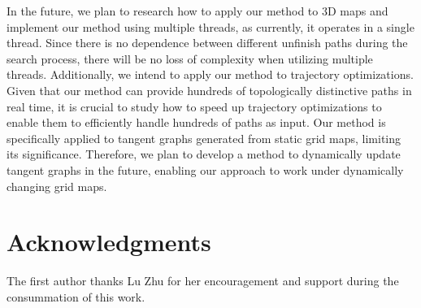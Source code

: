 \documentclass[letterpaper, 10 pt, journal, twoside]{IEEEtran}
\begin{document}
In the future, we plan to research how to apply our method to 3D maps and implement our method using multiple threads, as currently, it operates in a single thread. Since there is no dependence between different unfinish paths during the search process, there will be no loss of complexity when utilizing multiple threads. Additionally, we intend to apply our method to trajectory optimizations. Given that our method can provide hundreds of topologically distinctive paths in real time, it is crucial to study how to speed up trajectory optimizations to enable them to efficiently handle hundreds of paths as input. Our method is specifically applied to tangent graphs generated from static grid maps, limiting its significance. Therefore, we plan to develop a method to dynamically update tangent graphs in the future, enabling our approach to work under dynamically changing grid maps.


\section*{Acknowledgments}
The first author thanks Lu Zhu for her encouragement and support during the consummation of this work.

\normalem
\printbibliography






\end{document}
